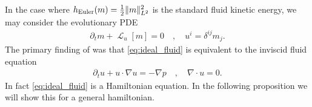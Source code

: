 \documentclass[12pt]{amsart}
\newcommand{\R}{\ensuremath{\mathbb{R}}}
\DeclareMathOperator{\SDiff}{SDiff}
\DeclareMathOperator{\lie}{\mathcal{L}}
\begin{document}
%  

In the case where $h_{\rm Euler}(m) = \frac{1}{2} \| m \|^2_{L^2}$ is the standard fluid kinetic energy, we may consider the evolutionary PDE
\begin{align}
	\partial_t m+ \lie_u [ m] = 0 \quad , \quad u^i = \delta^{ij} m_j. \label{eq:ideal_fluid}
\end{align}
The primary finding of \cite{Arnold1966} was that \eqref{eq:ideal_fluid} is equivalent to the
inviscid fluid equation
\begin{align*}
	\partial_t u + u \cdot \nabla u = - \nabla p \quad , \quad  \nabla \cdot u = 0.
\end{align*}
In fact \eqref{eq:ideal_fluid} is a Hamiltonian equation.
In the following proposition we will show this for a general hamiltonian.
\end{document}
